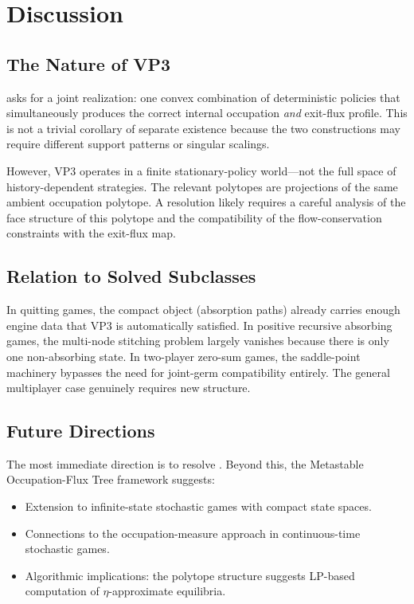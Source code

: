 \documentclass[12pt,a4paper]{article}
\theoremstyle{definition}
\begin{document}
\section{Discussion}
\label{sec:discussion}

\subsection{The Nature of VP3}

 asks for a joint realization: one convex combination of deterministic policies that simultaneously produces the correct internal occupation \emph{and} exit-flux profile. This is not a trivial corollary of separate existence because the two constructions may require different support patterns or singular scalings.

However, VP3 operates in a finite stationary-policy world---not the full space of history-dependent strategies. The relevant polytopes are projections of the same ambient occupation polytope. A resolution likely requires a careful analysis of the face structure of this polytope and the compatibility of the flow-conservation constraints with the exit-flux map.

\subsection{Relation to Solved Subclasses}

In quitting games, the compact object (absorption paths) already carries enough engine data that VP3 is automatically satisfied. In positive recursive absorbing games, the multi-node stitching problem largely vanishes because there is only one non-absorbing state. In two-player zero-sum games, the saddle-point machinery bypasses the need for joint-germ compatibility entirely. The general multiplayer case genuinely requires new structure.

\subsection{Future Directions}

The most immediate direction is to resolve . Beyond this, the Metastable Occupation-Flux Tree framework suggests:
\begin{itemize}
\item Extension to infinite-state stochastic games with compact state spaces.
\item Connections to the occupation-measure approach in continuous-time stochastic games.
\item Algorithmic implications: the polytope structure suggests LP-based computation of $\eta$-approximate equilibria.
\end{itemize}
\end{document}
